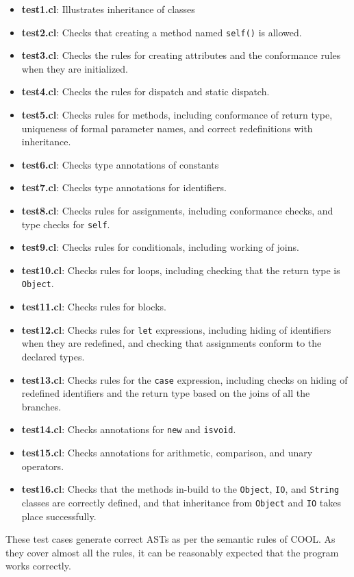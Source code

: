 \documentclass{article}
\begin{document}
\begin{itemize}
	\item \textbf{test1.cl}: Illustrates inheritance of classes
	\item \textbf{test2.cl}: Checks that creating a method named \verb|self()| is allowed.
	\item \textbf{test3.cl}: Checks the rules for creating attributes and the conformance rules when they are initialized.
	\item \textbf{test4.cl}: Checks the rules for dispatch and static dispatch.
	\item \textbf{test5.cl}: Checks rules for methods, including conformance of return type, uniqueness of formal parameter names, and correct redefinitions with inheritance.
	\item \textbf{test6.cl}: Checks type annotations of constants
	\item \textbf{test7.cl}: Checks type annotations for identifiers.
	\item \textbf{test8.cl}: Checks rules for assignments, including conformance checks, and type checks for \verb|self|.
	\item \textbf{test9.cl}: Checks rules for conditionals, including working of joins.
	\item \textbf{test10.cl}: Checks rules for loops, including checking that the return type is \verb|Object|.
	\item \textbf{test11.cl}: Checks rules for blocks.
	\item \textbf{test12.cl}: Checks rules for \verb|let| expressions, including hiding of identifiers when they are redefined, and checking that assignments conform to the declared types.
	\item \textbf{test13.cl}: Checks rules for the \verb|case| expression, including checks on hiding of redefined identifiers and the return type based on the joins of all the branches.
	\item \textbf{test14.cl}: Checks annotations for \verb|new| and \verb|isvoid|.
	\item \textbf{test15.cl}: Checks annotations for arithmetic, comparison, and unary operators.
	\item \textbf{test16.cl}: Checks that the methods in-build to the \verb|Object|, \verb|IO|, and \verb|String| classes are correctly defined, and that inheritance from \verb|Object| and \verb|IO| takes place successfully.
\end{itemize}
These test cases generate correct ASTs as per the semantic rules of COOL. As they cover almost all the rules, it can be reasonably expected that the program works correctly.
\end{document}
